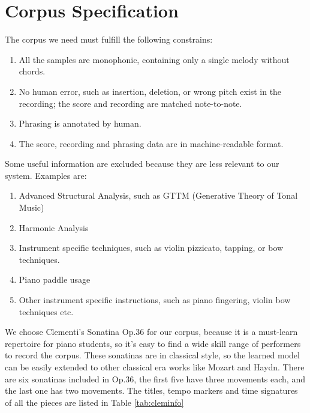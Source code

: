 \section{Corpus Specification}

The corpus we need must fulfill the following constrains:
\begin{enumerate}
   \item All the samples are monophonic, containing only a single melody without chords.
   \item No human error, such as insertion, deletion, or wrong pitch exist in the recording; the score and recording are matched note-to-note.
   \item Phrasing is annotated by human. 
   \item The score, recording and phrasing data are in machine-readable format.

\end{enumerate}

Some useful information are excluded because they are less relevant to our system. Examples are:

\begin{enumerate}
   \item Advanced Structural Analysis, such as GTTM (Generative Theory of Tonal Music)\cite{GTTM}
   \item Harmonic Analysis
   \item Instrument specific techniques, such as violin pizzicato, tapping, or bow techniques.
   \item Piano paddle usage
   \item Other instrument specific instructions, such as piano fingering, violin bow techniques etc.
\end{enumerate}

We choose Clementi's Sonatina Op.36 for our corpus, because it is a must-learn repertoire for piano students, so it's easy to find a wide skill range of performers to record the corpus. These sonatinas are in classical style, so the learned model can be easily extended to other classical era works like Mozart and Haydn. There are six sonatinas included in Op.36, the first five have three movements each, and the last one has two movements. The titles, tempo markers and time signatures of all the pieces are listed in Table \ref{tab:cleminfo}


